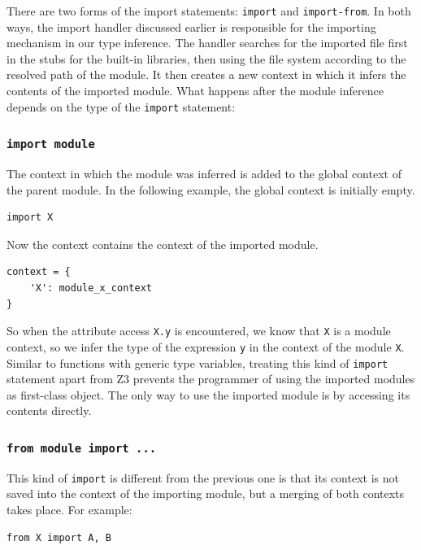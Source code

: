 There are two forms of the import statements: \lstinline|import| and \lstinline|import-from|. In both ways, the import handler discussed earlier is responsible for the importing mechanism in our type inference. The handler searches for the imported file first in the stubs for the built-in libraries, then using the file system according to the resolved path of the module. It then creates a new context in which it infers the contents of the imported module. What happens after the module inference depends on the type of the \lstinline|import| statement:

\subsubsection{\lstinline|import module|}
The context in which the module was inferred is added to the global context of the parent module. In the following example, the global context is initially empty.

\begin{lstlisting}
import X
\end{lstlisting}

Now the context contains the context of the imported module.

\begin{lstlisting}
context = {
	'X': module_x_context
}
\end{lstlisting}
So when the attribute access \lstinline|X.y| is encountered, we know that \lstinline|X| is a module context, so we infer the type of the expression \lstinline|y| in the context of the module \lstinline|X|. \\

Similar to functions with generic type variables, treating this kind of \lstinline|import| statement apart from Z3 prevents the programmer of using the imported modules as first-class object. The only way to use the imported module is by accessing its contents directly.

\subsubsection{\lstinline|from module import ...|} 
This kind of \lstinline|import| is different from the previous one is that its context is not saved into the context of the importing module, but a merging of both contexts takes place. For example:
\begin{lstlisting}
from X import A, B
\end{lstlisting}

